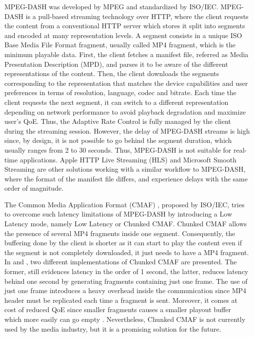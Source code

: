 MPEG-DASH \cite{sodagar2011mpeg} was developed by MPEG and standardized by ISO/IEC. MPEG-DASH is a pull-based streaming technology over HTTP, where the client requests the content from a conventional HTTP server which stores it split into segments and encoded at many representation levels. A segment consists in a unique ISO Base Media File Format fragment, usually called MP4 fragment, which is the minimum playable data. First, the client fetches a manifest file, referred as Media Presentation Description (MPD), and parses it to be aware of the different representations of the content. Then, the client downloads the segments corresponding to the representation that matches the device capabilities and user preferences in terms of resolution, language, codec and bitrate. Each time the client requests the next segment, it can switch to a different representation depending on network performance to avoid playback degradation and maximize user's QoE. Thus, the Adaptive Rate Control is fully managed by the client during the streaming session. However, the delay of MPEG-DASH streams is high since, by design, it is not possible to go behind the segment duration, which usually ranges from 2 to 30 seconds. Thus, MPEG-DASH is not suitable for real-time applications. Apple HTTP Live Streaming (HLS) and Microsoft Smooth Streaming are other solutions working with a similar workflow to MPEG-DASH, where the format of the manifest file differs, and experience delays with the same order of magnitude.

The Common Media Application Format (CMAF) \cite{hughes2017information}, proposed by ISO/IEC, tries to overcome such latency limitations of MPEG-DASH by introducing a Low Latency mode, namely Low Latency or Chunked CMAF. Chunked CMAF allows the presence of several MP4 fragments inside one segment. Consequently, the buffering done by the client is shorter as it can start to play the content even if the segment is not completely downloaded, it just needs to have a MP4 fragment. In \cite{wei2014} and \cite{essaili2018}, two different implementations of Chunked CMAF are presented. The former, \cite{wei2014} still evidences latency in the order of 1 second, the latter, \cite{essaili2018} reduces latency behind one second by generating fragments containing just one frame. The use of just one frame introduces a heavy overhead inside the communication since MP4 header must be replicated each time a fragment is sent. Moreover, it comes at cost of reduced QoE since smaller fragments causes a smaller playout buffer which more easily can go empty \cite{viola2019}. Nevertheless, Chunked CMAF is not currently used by the media industry, but it is a promising solution for the future.

